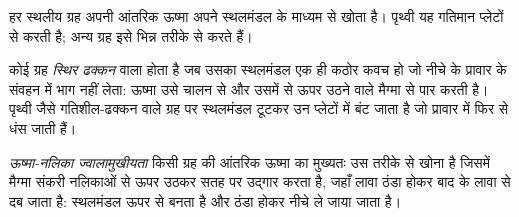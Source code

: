 हर स्थलीय ग्रह अपनी आंतरिक ऊष्मा अपने स्थलमंडल के माध्यम से खोता है।
पृथ्वी यह गतिमान प्लेटों से करती है; अन्य ग्रह इसे भिन्न तरीके से करते हैं।

\begin{definition}[स्थिर ढक्कन]\label{def:b3:planetary-interiors-surfaces:stagnant-lid}
कोई ग्रह \emph{स्थिर ढक्कन} वाला होता है जब उसका स्थलमंडल
एक ही कठोर कवच हो जो नीचे के प्रावार के संवहन में भाग नहीं लेता:
ऊष्मा उसे चालन से और उसमें से ऊपर उठने वाले मैग्मा से पार करती है।
पृथ्वी जैसे गतिशील-ढक्कन वाले ग्रह पर स्थलमंडल
टूटकर उन प्लेटों में बंट जाता है जो प्रावार में फिर से धंस जाती हैं।
\end{definition}

\begin{definition}[ऊष्मा-नलिका ज्वालामुखीयता]\label{def:b3:planetary-interiors-surfaces:heat-pipe}
\emph{ऊष्मा-नलिका ज्वालामुखीयता} किसी ग्रह की आंतरिक ऊष्मा का
मुख्यतः उस तरीके से खोना है जिसमें मैग्मा संकरी नलिकाओं से ऊपर उठकर
सतह पर उद्गार करता है, जहाँ लावा ठंडा होकर बाद के लावा से दब जाता है:
स्थलमंडल ऊपर से बनता है और ठंडा होकर नीचे ले जाया जाता है।
\end{definition}

